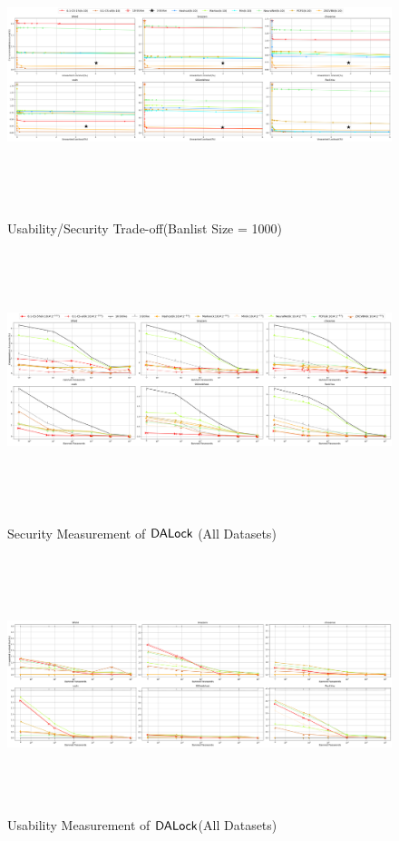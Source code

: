 	\begin{figure}
		\includegraphics[width=\linewidth, height = 7.5cm]{Figures/Experiments/B1000.png}
		\vspace{-0.2in}
		\caption[Usability/Security Trade-off]{Usability/Security Trade-off(Banlist Size = 1000)}
		\label{fig:secuseB1000}
		\includegraphics[width=\linewidth, height = 7.5cm]{Figures/Experiments/Attacker/SecurityBigPictureFull}
		\vspace{-0.2in}
		\caption{Security Measurement of $\mathsf{DALock}$ (All Datasets)}
		\label{fig:securitydpcomparefull}	
		\includegraphics[width=\linewidth, height = 7.5cm]{Figures/Experiments/Utility/UsabilityBigPictureFull}
		\vspace{-0.2in}
		\caption{Usability Measurement of $\mathsf{DALock}$(All Datasets)}
		\label{fig:usabilitydpcomparefull}	
	\end{figure}
	






